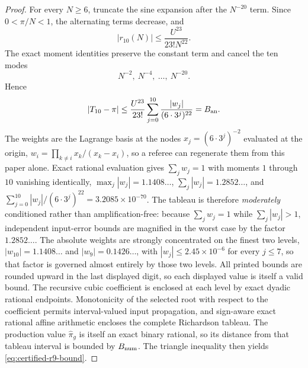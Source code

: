 \documentclass[12pt]{article}
\theoremstyle{definition}
\theoremstyle{remark}
\newcommand{\abs}[1]{\left|#1\right|}
\begin{document}
\begin{proof}
For every $N\ge6$, truncate the sine expansion after the $N^{-20}$ term.  Since
$0<\pi/N<1$, the alternating terms decrease, and
\[
  \abs{r_{10}(N)}
  \le
  \frac{U^{23}}{23!N^{22}}.
\]
The exact moment identities preserve the constant term and cancel the ten modes
\[
  N^{-2},\ N^{-4},\ \ldots,\ N^{-20}.
\]
Hence
\[
  \abs{T_{10}-\pi}
  \le
  \frac{U^{23}}{23!}
  \sum_{j=0}^{10}\frac{\abs{w_j}}{(6\cdot3^j)^{22}}
  =B_{\rm an}.
\]
The weights are the Lagrange basis at the nodes $x_j=(6\cdot3^j)^{-2}$
evaluated at the origin, $w_i=\prod_{k\ne i}x_k/(x_k-x_i)$, so a referee can
regenerate them from this paper alone.  Exact rational evaluation gives
$\sum_jw_j=1$ with moments $1$ through $10$ vanishing identically,
$\max_j\abs{w_j}=1.1408\ldots$, $\sum_j\abs{w_j}=1.2852\ldots$, and
$\sum_{j=0}^{10}\abs{w_j}/(6\cdot3^j)^{22}=3.2085\times10^{-70}$.  The tableau
is therefore \emph{moderately} conditioned rather than amplification-free:
because $\sum_jw_j=1$ while $\sum_j\abs{w_j}>1$, independent input-error bounds
are magnified in the worst case by the factor $1.2852\ldots$.  The absolute
weights are strongly concentrated on the finest two levels,
$\abs{w_{10}}=1.1408\ldots$ and $\abs{w_9}=0.1426\ldots$, with
$\abs{w_j}\le2.45\times10^{-6}$ for every $j\le7$, so that factor is governed
almost entirely by those two levels.  All printed
bounds are rounded upward in the last displayed digit, so each displayed value
is itself a valid bound.
The recursive cubic coefficient is enclosed at each level by exact dyadic
rational endpoints.  Monotonicity of the selected root with respect to the
coefficient permits interval-valued input propagation, and sign-aware exact
rational affine arithmetic encloses the complete Richardson tableau.  The
production value $\widehat\pi_g$ is itself an exact binary rational, so its
distance from that tableau interval is bounded by $B_{\rm num}$.  The triangle inequality
then yields \eqref{eq:certified-r9-bound}.
\end{proof}
\end{document}
